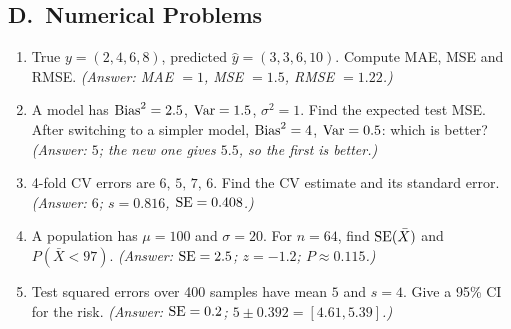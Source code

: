 \subsection*{D.\ Numerical Problems}
\begin{enumerate}
  \item True $y=(2,4,6,8)$, predicted $\hat y=(3,3,6,10)$. Compute MAE, MSE and RMSE. \textit{(Answer: MAE $=1$, MSE $=1.5$, RMSE $=1.22$.)}
  \item A model has $\operatorname{Bias}^2=2.5$, $\operatorname{Var}=1.5$, $\sigma^2=1$. Find the expected test MSE. After switching to a simpler model, $\operatorname{Bias}^2=4$, $\operatorname{Var}=0.5$: which is better? \textit{(Answer: $5$; the new one gives $5.5$, so the first is better.)}
  \item 4-fold CV errors are $6,\,5,\,7,\,6$. Find the CV estimate and its standard error. \textit{(Answer: $6$; $s=0.816$, $\operatorname{SE}=0.408$.)}
  \item A population has $\mu=100$ and $\sigma=20$. For $n=64$, find $\operatorname{SE}(\bar X)$ and $P(\bar X<97)$. \textit{(Answer: $\operatorname{SE}=2.5$; $z=-1.2$; $P\approx0.115$.)}
  \item Test squared errors over 400 samples have mean $5$ and $s=4$. Give a 95\% CI for the risk. \textit{(Answer: $\operatorname{SE}=0.2$; $5\pm0.392=[4.61,5.39]$.)}
\end{enumerate}

